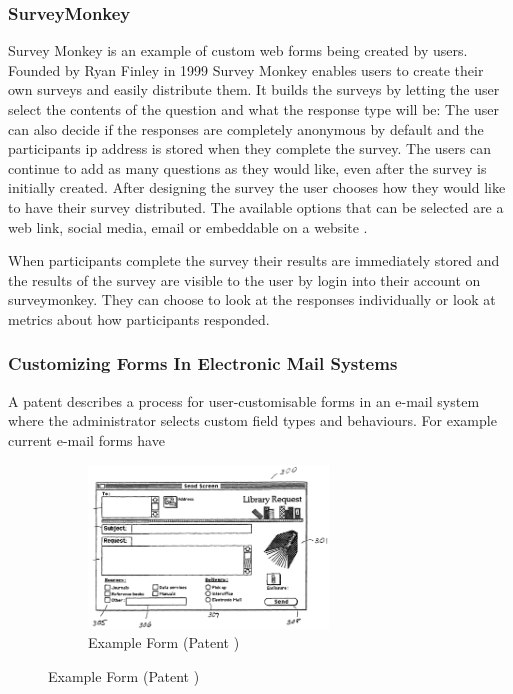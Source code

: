 \documentclass[12pt]{article}  %
\begin{document}
\subsubsection{SurveyMonkey}
Survey Monkey \cite{finley_surveymonkey_1999} is an example of custom web forms being created by users. Founded by Ryan Finley in 1999 Survey Monkey enables users to create their own surveys and easily distribute them. It builds the surveys by letting the user select the contents of the question and what the response type will be: The user can also decide if the responses are completely anonymous by default and the participants ip address is stored when they complete the survey. The users can continue to add as many questions as they would like, even after the survey is initially created. After designing the survey the user chooses how they would like to have their survey distributed. The available options that can be selected are a web link, social media, email or embeddable on a website \cite{waclawski_how_2012} . 

When participants complete the survey their results are immediately stored and the results of the survey are visible to the user by login into their account on surveymonkey. They can choose to look at the responses individually or look at metrics about how participants responded.


\subsubsection{Customizing Forms In Electronic Mail Systems}
\noindent
A patent \cite{holt_customizing_2006} describes a process for user-customisable forms in an e-mail system where the administrator selects custom field types and behaviours.  For example current e-mail forms have 

\begin{figure}
\vspace*{-\baselineskip}
\begin{figure}[H]
  \includegraphics[width=0.7\textwidth]{images/emailform.png}
	\caption{Example Form (Patent \cite{holt_customizing_2006})}
	\label{fig:emailform}
\end{figure}
\end{figure}
\end{document}
